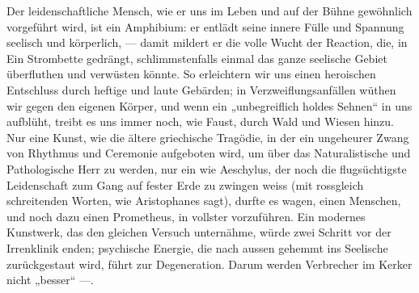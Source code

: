 Der leidenschaftliche Mensch, wie er uns im Leben und auf der Bühne gewöhnlich vorgeführt wird, ist ein Amphibium: er entlädt seine innere Fülle und Spannung  seelisch und körperlich, — damit mildert er die volle Wucht der Reaction, die, in Ein Strombette gedrängt, schlimmstenfalls einmal das ganze seelische Gebiet überfluthen und verwüsten könnte. So erleichtern wir uns einen heroischen Entschluss durch heftige und laute Gebärden; in Verzweiflungsanfällen wüthen wir gegen den eigenen Körper, und wenn ein „unbegreiflich holdes Sehnen“ in uns aufblüht, treibt es uns immer noch, wie Faust, durch Wald und Wiesen hinzu. Nur eine Kunst, wie die ältere griechische Tragödie, in der ein ungeheurer Zwang von Rhythmus und Ceremonie aufgeboten wird, um über das Naturalistische und Pathologische Herr zu werden, nur ein   wie Aeschylus, der noch die flugsüchtigste Leidenschaft zum Gang auf fester Erde zu zwingen weiss (mit rossgleich schreitenden Worten, wie Aristophanes sagt), durfte es wagen, einen Menschen, und noch dazu einen Prometheus, in vollster  vorzuführen. Ein modernes Kunstwerk, das den gleichen Versuch unternähme, würde zwei Schritt vor der Irrenklinik enden; psychische Energie, die nach aussen gehemmt ins Seelische zurückgestaut wird, führt zur Degeneration. Darum werden Verbrecher im Kerker nicht „besser“ —.
\par

